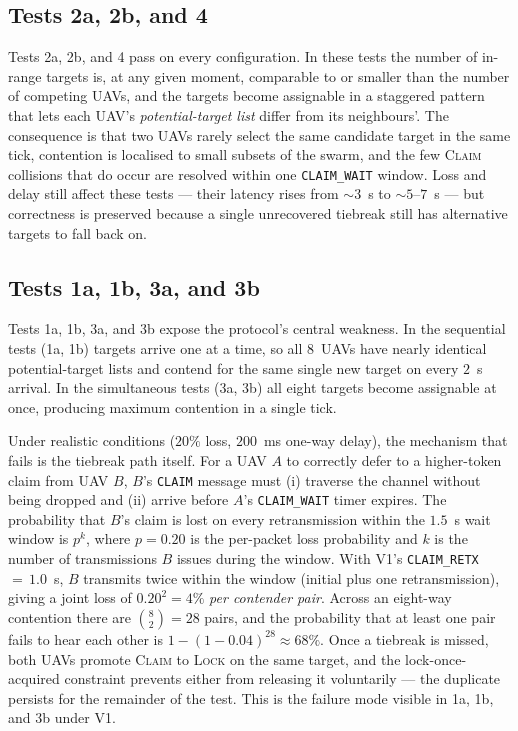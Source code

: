 \documentclass[11pt,letterpaper]{article}
\begin{document}
\subsection{Tests 2a, 2b, and 4}

Tests 2a, 2b, and 4 pass on every configuration. In these tests the
number of in-range targets is, at any given moment, comparable to or
smaller than the number of competing UAVs, and the targets become
assignable in a staggered pattern that lets each UAV's
\textit{potential-target list} differ from its neighbours'. The
consequence is that two UAVs rarely select the same candidate target
in the same tick, contention is localised to small subsets of the
swarm, and the few \textsc{Claim} collisions that do occur are
resolved within one \texttt{CLAIM\_WAIT} window. Loss and delay still
affect these tests --- their latency rises from $\sim\!3$~s to
$\sim\!5$--$7$~s --- but correctness is preserved because a single
unrecovered tiebreak still has alternative targets to fall back on.

\subsection{Tests 1a, 1b, 3a, and 3b}

Tests 1a, 1b, 3a, and 3b expose the protocol's central weakness. In the
sequential tests (1a, 1b) targets arrive one at a time, so all
$8$~UAVs have nearly identical potential-target lists and contend for
the same single new target on every $2$~s arrival. In the simultaneous
tests (3a, 3b) all eight targets become assignable at once, producing
maximum contention in a single tick.

Under realistic conditions ($20\%$ loss, $200$~ms one-way delay), the
mechanism that fails is the tiebreak path itself. For a UAV $A$ to
correctly defer to a higher-token claim from UAV $B$, $B$'s
\texttt{CLAIM} message must (i) traverse the channel without being
dropped and (ii) arrive before $A$'s \texttt{CLAIM\_WAIT} timer
expires. The probability that $B$'s claim is lost on every
retransmission within the $1.5$~s wait window is $p^{k}$, where
$p\!=\!0.20$ is the per-packet loss probability and $k$ is the number
of transmissions $B$ issues during the window. With V1's
\texttt{CLAIM\_RETX}\,$=\,1.0$~s, $B$ transmits twice within the
window (initial plus one retransmission), giving a joint loss of
$0.20^{2}\!=\!4\%$ \textit{per contender pair}. Across an eight-way
contention there are $\binom{8}{2}\!=\!28$ pairs, and the probability
that at least one pair fails to hear each other is
$1\!-\!(1\!-\!0.04)^{28} \approx 68\%$. Once a tiebreak is missed, both
UAVs promote \textsc{Claim} to \textsc{Lock} on the same target, and
the lock-once-acquired constraint prevents either from releasing it
voluntarily --- the duplicate persists for the remainder of the test.
This is the failure mode visible in 1a, 1b, and 3b under V1.
\end{document}
